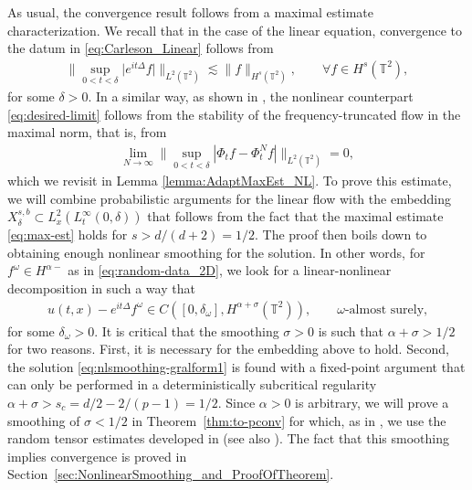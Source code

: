 \documentclass[11pt, xcolor = dvipsnames,reqno
]{amsart}
\theoremstyle{definition}
\theoremstyle{remark}
\begin{document}
    As usual, the convergence result follows from a maximal estimate characterization. 
    We recall that in the case of the linear equation, convergence to the datum in \eqref{eq:Carleson_Linear} follows from
    \begin{align}\label{eq:max-est}
        \Big\| \sup_{0 < t < \delta} \big| e^{it\Delta} f \big| \Big\|_{L^2(\mathbb{T}^2)} \lesssim \|f\|_{H^s(\mathbb{T}^2)},
        \qquad \forall f \in H^s(\mathbb T^2), 
    \end{align}
    for some $\delta > 0$. 
    In a similar way, as shown in \cite{CLS2020}, 
    the nonlinear counterpart \eqref{eq:desired-limit} follows from the stability of the frequency-truncated flow in the maximal norm, that is, from 
    \begin{align}\label{eq:Stability_Intro}
        \lim_{N \rightarrow \infty} 
			\Big\| \sup_{0 < t < \delta} 
			| \Phi_t f   - \Phi^N_t f  | \Big\|_{L^2(\mathbb{T}^2)} = 0,
    \end{align}
    which we revisit in Lemma \ref{lemma:AdaptMaxEst_NL}.
    To prove this estimate, we will combine probabilistic arguments for the linear flow with the embedding $X^{s,b}_\delta \subset L^2_x(L^\infty_t(0,\delta))$ that follows from the fact that the maximal estimate \eqref{eq:max-est} holds for $s > d/(d+2) = 1/2$.
    The proof then boils down to obtaining enough nonlinear smoothing for the solution. 
    In other words, for $f^\omega \in H^{\alpha -}$ as in \eqref{eq:random-data_2D}, we look for a linear-nonlinear decomposition in such a way that 
    \begin{align}\label{eq:nlsmoothing-gralform1}
        u(t,x) - e^{it\Delta} f^{\omega} \in C([0,\delta_{\omega}] , H^{\alpha + \sigma}(\mathbb{T}^2)),
        \qquad \omega\text{-almost surely,}
    \end{align}
    for some $\delta_\omega > 0$. It is critical that the smoothing $\sigma > 0$ is such that $\alpha + \sigma > 1/2$ for two reasons. 
    First, it is necessary for the embedding above to hold. 
    Second, the solution \eqref{eq:nlsmoothing-gralform1} is found with a fixed-point argument that can only be performed in a deterministically subcritical regularity $\alpha + \sigma > s_c = d/2 - 2/(p-1) =  1/2$. 
    Since $\alpha > 0$ is arbitrary, we will prove a smoothing of $\sigma < 1/2$ in Theorem~\ref{thm:to-pconv} 
    for which, as in \cite{OhWang2025}, we use the random tensor estimates developed in \cite{DNY2022} (see also \cite{Kaneshiro2025}). 
    The fact that this smoothing implies convergence is proved in Section~\ref{sec:NonlinearSmoothing_and_ProofOfTheorem}.
\end{document}

